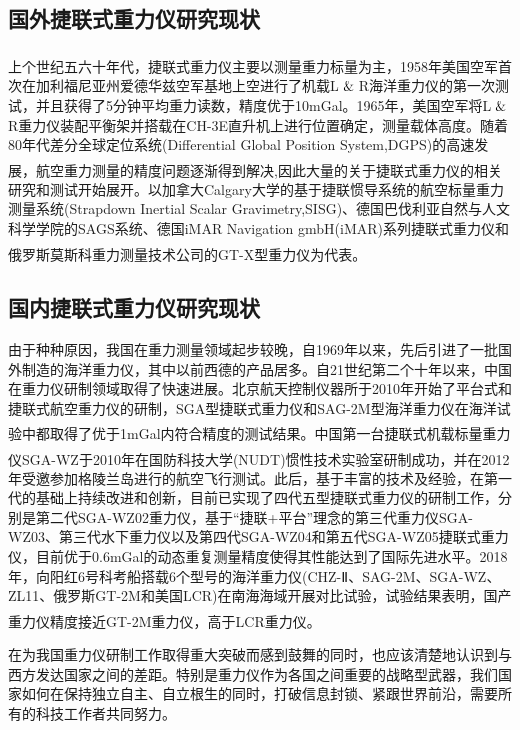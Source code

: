 \documentclass[12pt,a4,utf8]{article}
\newcommand{\upcite}[1]{\textsuperscript{\textsuperscript{\cite{#1}}}} %
\begin{document}
\subsection{国外捷联式重力仪研究现状}
上个世纪五六十年代，捷联式重力仪主要以测量重力标量为主\upcite{peshekhonovstate,thompson1959aerial,thompson1960aerial}，1958年美国空军首次在加利福尼亚州爱德华兹空军基地上空进行了机载L$\And$R海洋重力仪的第一次测试，并且获得了5分钟平均重力读数，精度优于10mGal。1965年，美国空军将L$\And$R重力仪装配平衡架并搭载在CH-3E直升机上进行位置确定，测量载体高度。随着80年代差分全球定位系统(Differential Global Position System,DGPS)的高速发展，航空重力测量的精度问题逐渐得到解决\upcite{thompson1960aerial,brozena1989interferometric,schwarz1989comparison,kleusberg1990airborne},因此大量的关于捷联式重力仪的相关研究和测试开始展开。以加拿大Calgary大学的基于捷联惯导系统的航空标量重力测量系统(Strapdown Inertial Scalar Gravimetry,SISG)、德国巴伐利亚自然与人文科学学院的SAGS系统、德国iMAR Navigation gmbH(iMAR)系列捷联式重力仪和俄罗斯莫斯科重力测量技术公司的GT-X型重力仪为代表\upcite{bruton2000improving,meyer2003angel,bastos2002gravity,boedecker2006sags4,berzhitskii2010airborne,hoss20201}。
\subsection{国内捷联式重力仪研究现状}
由于种种原因，我国在重力测量领域起步较晚，自1969年以来，先后引进了一批国外制造的海洋重力仪，其中以前西德的产品居多。自21世纪第二个十年以来，中国在重力仪研制领域取得了快速进展。北京航天控制仪器所于2010年开始了平台式和捷联式航空重力仪的研制，SGA型捷联式重力仪和SAG-2M型海洋重力仪在海洋试验中都取得了优于1mGal内符合精度的测试结果\upcite{xiurui}。中国第一台捷联式机载标量重力仪SGA-WZ于2010年在国防科技大学(NUDT)惯性技术实验室研制成功\upcite{DHKZ2020Z1020}，并在2012年受邀参加格陵兰岛进行的航空飞行测试。此后，基于丰富的技术及经验，在第一代的基础上持续改进和创新，目前已实现了四代五型捷联式重力仪的研制工作，分别是第二代SGA-WZ02重力仪，基于“捷联+平台”理念的第三代重力仪SGA-WZ03、第三代水下重力仪以及第四代SGA-WZ04和第五代SGA-WZ05捷联式重力仪，目前优于0.6mGal的动态重复测量精度使得其性能达到了国际先进水平。2018年，向阳红6号科考船搭载6个型号的海洋重力仪(CHZ-Ⅱ、SAG-2M、SGA-WZ、ZL11、俄罗斯GT-2M和美国LCR)在南海海域开展对比试验，试验结果表明，国产重力仪精度接近GT-2M重力仪，高于LCR重力仪\upcite{yuan2020performance}。

在为我国重力仪研制工作取得重大突破而感到鼓舞的同时，也应该清楚地认识到与西方发达国家之间的差距。特别是重力仪作为各国之间重要的战略型武器，我们国家如何在保持独立自主、自立根生的同时，打破信息封锁、紧跟世界前沿，需要所有的科技工作者共同努力。
\end{document}
